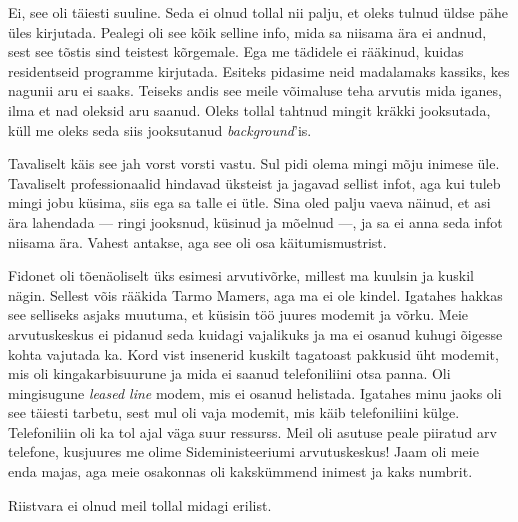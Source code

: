 
Ei, see oli täiesti suuline. Seda ei olnud tollal nii palju, et oleks tulnud üldse pähe üles 
kirjutada. Pealegi oli see kõik selline info, mida sa niisama ära ei 
andnud, sest see tõstis sind teistest kõrgemale. Ega me 
tädidele ei rääkinud, kuidas residentseid programme kirjutada. Esiteks
pidasime neid madalamaks kassiks, kes nagunii aru ei saaks. Teiseks andis see 
meile võimaluse teha arvutis mida iganes, ilma et nad oleksid aru
saanud. Oleks tollal tahtnud mingit kräkki jooksutada, küll me oleks seda siis
jooksutanud \emph{background}'is.


Tavaliselt käis see jah vorst vorsti vastu. Sul pidi olema mingi mõju 
inimese üle. Tavaliselt professionaalid hindavad üksteist ja jagavad sellist 
infot, aga kui tuleb mingi jobu küsima, siis ega sa talle ei ütle. Sina oled palju 
vaeva näinud, et asi ära lahendada --- ringi jooksnud, küsinud ja mõelnud ---, ja 
sa ei anna seda infot niisama ära. Vahest antakse, aga see oli osa 
käitumismustrist. 

Fidonet oli tõenäoliselt üks esimesi arvutivõrke, millest ma kuulsin ja kuskil 
nägin. Sellest võis rääkida Tarmo Mamers, aga ma ei ole kindel. Igatahes hakkas see selliseks asjaks muutuma, et 
küsisin töö juures modemit ja võrku. Meie 
arvutuskeskus ei pidanud seda kuidagi vajalikuks ja ma ei osanud kuhugi 
õigesse kohta vajutada ka. Kord vist insenerid kuskilt tagatoast 
pakkusid üht modemit, mis oli kingakarbisuurune ja mida ei saanud telefoniliini otsa panna. Oli mingisugune 
\emph{leased line} modem, mis ei osanud helistada. Igatahes 
minu jaoks oli see täiesti tarbetu, sest mul oli vaja modemit, mis käib 
telefoniliini külge. Telefoniliin oli ka tol ajal väga suur ressurss. Meil oli 
asutuse peale piiratud arv telefone, kusjuures me olime Sideministeeriumi 
arvutuskeskus! Jaam oli meie enda majas, aga meie osakonnas oli kakskümmend 
inimest ja kaks numbrit. 


Riistvara ei olnud meil tollal midagi erilist.


